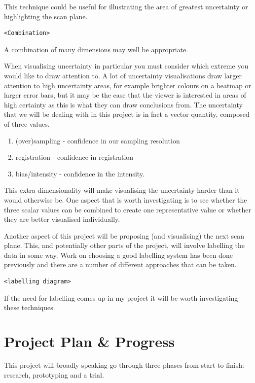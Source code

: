 \documentclass[
  oneside,
  11pt, a4paper,
  footinclude=true,
  headinclude=true,
  cleardoublepage=empty
]{scrbook}
\begin{document}
This technique could be useful for illustrating the area of greatest uncertainty or highlighting the scan plane.

\begin{verbatim}
<Combination>
\end{verbatim}

A combination of many dimensions may well be appropriate.

When visualising uncertainty in particular you must consider which extreme you would like to draw attention to. A lot of uncertainty visualisations draw larger attention to high uncertainty areas, for example brighter colours on a heatmap or larger error bars, but it may be the case that the viewer is interested in areas of high certainty as this is what they can draw conclusions from.
The uncertainty that we will be dealing with in this project is in fact a vector quantity, composed of three values. 

\begin{enumerate}
	\item (over)sampling - confidence in our sampling resolution
	\item registration - confidence in registration
	\item bias/intensity - confidence in the intensity.
\end{enumerate}

This extra dimensionality will make visualising the uncertainty harder than it would otherwise be. One aspect that is worth investigating is to see whether the three scalar values can be combined to create one representative value or whether they are better visualised individually.

Another aspect of this project will be proposing (and visualising) the next scan plane. This, and potentially other parts of the project, will involve labelling the data in some way. Work on choosing a good labelling system has been done previously and there are a number of different approaches that can be taken\cite{labelling}.

\begin{verbatim}
<labelling diagram>
\end{verbatim}

If the need for labelling comes up in my project it will be worth investigating these techniques.

\chapter{Project Plan \& Progress}
This project will broadly speaking go through three phases from start to finish: research, prototyping and a trial.
\end{document}
